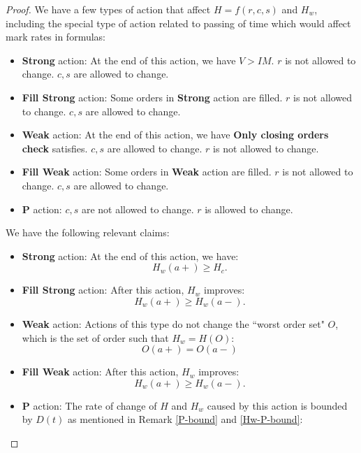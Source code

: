 \documentclass[notitlepage,reqno,11pt]{amsart}
\numberwithin{equation}{section}
\begin{document}
\begin{proof}
    

We have a few types of action that affect $H = f(r,c,s)$ and $H_w$, including the special type of action related to passing of time which would affect mark rates in formulas:
\begin{itemize}
    \item \textbf{Strong} action: At the end of this action, we have $V > IM$. $r$ is not allowed to change. $c,s$ are allowed to change.
    \item \textbf{Fill Strong} action: Some orders in \textbf{Strong} action are filled. $r$ is not allowed to change. $c,s$ are allowed to change.
    \item \textbf{Weak} action: At the end of this action, we have \textbf{Only closing orders check} satisfies. $c,s$ are allowed to change. $r$ is not allowed to change.
    \item \textbf{Fill Weak} action: Some orders in \textbf{Weak} action are filled. $r$ is not allowed to change. $c,s$ are allowed to change.
    \item \textbf{P} action: $c,s$ are not allowed to change. $r$ is allowed to change.
\end{itemize}

We have the following relevant claims:
\begin{itemize}
    \item \textbf{Strong} action: At the end of this action, we have:
    \begin{equation}
        H_w(a+) \geq H_c.
    \end{equation}
    \item \textbf{Fill Strong} action: After this action, $H_w$ improves: 
    \begin{equation}
        H_w(a+) \geq H_w(a-).
    \end{equation}
    \item \textbf{Weak} action: Actions of this type do not change the ``worst order set" $O$, which is the set of order such that $H_w = H(O)$: 
    \begin{equation}
        O(a+) = O(a-)
    \end{equation}
    \item \textbf{Fill Weak} action: After this action, $H_w$ improves: \begin{equation}
        H_w(a+) \geq H_w(a-).
    \end{equation}
    \item \textbf{P} action: The rate of change of $H$ and $H_w$ caused by this action is bounded by $D(t)$ as mentioned in Remark \ref{P-bound} and \ref{Hw-P-bound}: 
\end{itemize}


\end{proof}
\end{document}

